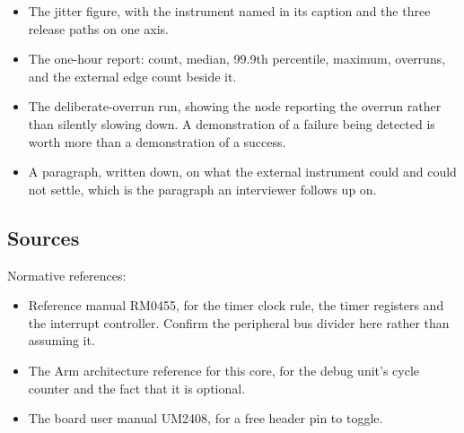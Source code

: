 \begin{itemize}
\item The jitter figure, with the instrument named in its caption and the three
release paths on one axis.
\item The one-hour report: count, median, 99.9th percentile, maximum, overruns,
and the external edge count beside it.
\item The deliberate-overrun run, showing the node reporting the overrun rather
than silently slowing down. A demonstration of a failure being detected is worth
more than a demonstration of a success.
\item A paragraph, written down, on what the external instrument could and could
not settle, which is the paragraph an interviewer follows up on.
\end{itemize}

\subsection*{Sources}

Normative references:
\begin{itemize}
\item Reference manual RM0455, for the timer clock rule, the timer registers and
the interrupt controller. Confirm the peripheral bus divider here rather than
assuming it.
\item The Arm architecture reference for this core, for the debug unit's cycle
counter and the fact that it is optional.
\item The board user manual UM2408, for a free header pin to toggle.
\end{itemize}

